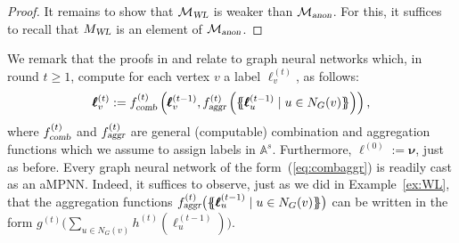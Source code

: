 \begin{proof}
%
%

It remains to show that $\mathcal{M}_{\textsl{WL}}$ is weaker than $\mathcal{M}_{\textsl{anon}}$. For this, it suffices to recall that $M_{\textsl{WL}}$ is an element of $\mathcal{M}_{\textsl{anon}}$.
\end{proof}

We remark that the proofs in \cite{xhlj19} and \cite{grohewl} relate to  graph neural networks which, in round $t\geq 1$, compute for each vertex $v$ a label $\pmb{\ell}^{(t)}_{v}$, as follows:
\begin{equation}
\pmb{\ell}^{(t)}_{v}:=
f_{\textsl{comb}}^{(t)}\left(
\pmb{\ell}_{v}^{(t-1)},f_{\textsl{aggr}}^{(t)}\left(\{\!\!\{ \pmb{\ell}^{(t-1)}_{u} \mid u \in N_G(v) \}\!\!\}\right)
\right), \label{eq:combaggr}
\end{equation}
where $f_{\textsl{comb}}^{(t)}$ and  $f_{\textsl{aggr}}^{(t)}$ are general (computable) combination and aggregation functions which we assume to assign labels in $\mathbb{A}^s$. Furthermore, $\pmb{\ell}^{(0)}:=\pmb{\nu}$, just as before. Every graph neural network of the form~(\ref{eq:combaggr}) is readily cast as an aMPNN. Indeed,
it suffices to observe, just as we did in Example~\ref{ex:WL}, that the aggregation functions $f_{\textsl{aggr}}^{(t)}\bigl(\{\!\!\{ \pmb{\ell}^{(t-1)}_{u} \mid u \in N_G(v) \}\!\!\}\bigr)$ can be written in the form $g^{(t)}\bigl(\sum_{u\in N_G(v)} h^{(t)}(\pmb{\ell}^{(t-1)}_{u})\bigr)$. 

